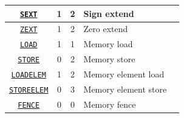 \documentclass{article}
\begin{document}
\begin{table}[h]
\begin{center}
\begin{tabular}{|c|c|c|l|l}
\hline
\hyperref[sec:SEXT]{\texttt{SEXT}} & 1 & 2 & Sign extend\\
\hline
\hyperref[sec:ZEXT]{\texttt{ZEXT}} & 1 & 2 & Zero extend\\
\hline
\hyperref[sec:LOAD]{\texttt{LOAD}} & 1 & 1 & Memory load\\
\hline
\hyperref[sec:STORE]{\texttt{STORE}} & 0 & 2 & Memory store\\
\hline
\hyperref[sec:LOADELEM]{\texttt{LOADELEM}} & 1 & 2 & Memory element load\\
\hline
\hyperref[sec:STOREELEM]{\texttt{STOREELEM}} & 0 & 3 & Memory element store\\
\hline
\hyperref[sec:FENCE]{\texttt{FENCE}} & 0 & 0 & Memory fence\\
\hline
\end{tabular}
\end{center}
\end{table}


\clearpage




\end{document}
